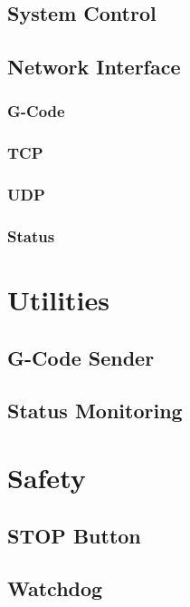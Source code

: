 		\subsection{System Control}
		
		\subsection{Network Interface}
			
			\subsubsection{G-Code}
			
				\subsubsection{TCP}
				
				\subsubsection{UDP}
			
			\subsubsection{Status}
	
	\section{Utilities}
		
		\subsection{G-Code Sender}
		
		\subsection{Status Monitoring}
	
	\section{Safety}
		
		\subsection{STOP Button}
		
		\subsection{Watchdog}
		
